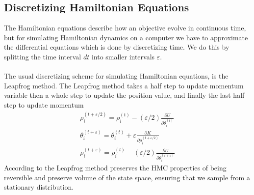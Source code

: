 \subsection{Discretizing Hamiltonian Equations}
The Hamiltonian equations describe how an objective evolve in continuous time, but for simulating Hamiltonian dynamics on a computer we have to approximate the differential equations which is done by discretizing time. We do this by splitting the time interval $dt$ into smaller intervals $\varepsilon$. 
\\
\\
The usual discretizing scheme for simulating Hamiltonian equations, is the Leapfrog method. The Leapfrog method takes a half step to update momentum variable then a whole step to update the position value, and finally the last half step to update momentum
\begin{equation*}
\begin{split}
\rho_{i}^{(t+\varepsilon / 2)}=\rho_{i}^{(t)}-(\varepsilon / 2) \frac{\partial U}{\partial \theta_{i}^{(t)}} \\
\theta_{i}^{(t+\varepsilon)}=\theta_{i}^{(t)}+\varepsilon \frac{\partial K}{\partial \rho_{i}^{(t+\varepsilon / 2)}} \\
\rho_{i}^{(t+\varepsilon)}=\rho_{i}^{(t)}-(\varepsilon / 2) \frac{\partial U}{\partial \theta_{i}^{(t+\varepsilon)}}
\end{split}
\end{equation*}
According to \cite{neal2012mcmc} the Leapfrog method preserves the HMC properties of being reversible and preserve volume of the state space, ensuring that we sample from a stationary distribution.


